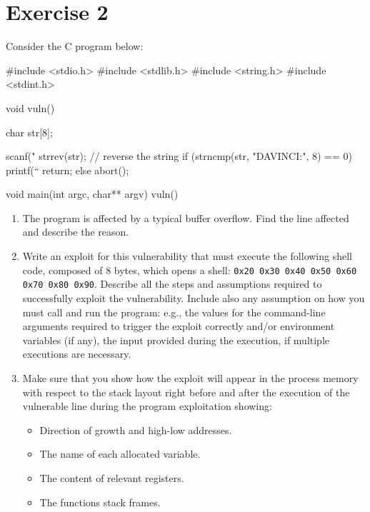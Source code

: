 \section{Exercise 2}

Consider the C program below:
\begin{verbnobox}[\verbarg]
#include <stdio.h>
#include <stdlib.h>
#include <string.h>
#include <stdint.h>

void vuln() {
    char str[8];

    scanf("%
    strrev(str); // reverse the string
    if (strncmp(str, "DAVINCI:", 8) == 0) {
        printf(“%
        return;
    }
    else
        abort();
}

void main(int argc, char** argv) {
    vuln()
}
\end{verbnobox}
\begin{enumerate}
    \item The program is affected by a typical buffer overflow. 
        Find the line affected and describe the reason. 
    \item Write an exploit for this vulnerability that must execute the following shell code, composed of 8 bytes, which opens a shell: \texttt{0x20 0x30 0x40 0x50 0x60 0x70 0x80 0x90}.
        Describe all the steps and assumptions required to successfully exploit the vulnerability. 
        Include also any assumption on how you must call and run the program: e.g., the values for the command-line arguments required to trigger the exploit correctly and/or environment variables (if any), the input provided during the execution, if multiple executions are necessary. 
    \item Make sure that you show how the exploit will appear in the process memory with respect to the stack layout right before and after the execution of the vulnerable line during the program exploitation showing:
        \begin{itemize}
            \item Direction of growth and high-low addresses.
            \item The name of each allocated variable.
            \item The content of relevant registers.
            \item The functions stack frames.
        \end{itemize}
\end{enumerate}

